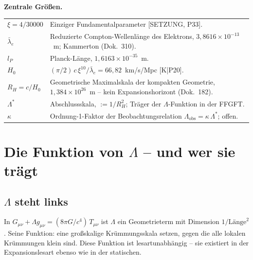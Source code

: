 \documentclass[11pt]{report}
\begin{document}
\medskip
\noindent\textbf{Zentrale Größen.}

\medskip
\begin{tabular}{@{}lp{10.5cm}}
$\xi = 4/30000$ & Einziger Fundamentalparameter [SETZUNG, P33]. \\[4pt]
$\bar\lambda_e$ & Reduzierte Compton-Wellenlänge des Elektrons,
                  $3{,}8616\times10^{-13}$~m; Kammerton (Dok.~310). \\[4pt]
$l_P$           & Planck-Länge, $1{,}6163\times10^{-35}$~m. \\[4pt]
$H_0$           & $(\pi/2)\,c\,\xi^{10}/\bar\lambda_e
                   = 66{,}82$~km/s/Mpc [K|P20]. \\[4pt]
$R_H = c/H_0$   & Geometrische Maximalskala der kompakten Geometrie,
                  $1{,}384\times10^{26}$~m -- kein Expansionshorizont
                  (Dok.~182). \\[4pt]
$\Lambda^{*}$   & Abschlussskala, $:= 1/R_H^2$; Träger der
                  $\Lambda$-Funktion in der FFGFT. \\[4pt]
$\kappa$        & Ordnung-1-Faktor der Beobachtungsrelation
                  $\Lambda_\text{obs} = \kappa\,\Lambda^{*}$; offen. \\
\end{tabular}

\chapter{Die Funktion von $\Lambda$ -- und wer sie trägt}
\label{ch:funktion}

\section{$\Lambda$ steht links}
\label{sec:links}

In $G_{\mu\nu} + \Lambda g_{\mu\nu} = (8\pi G/c^4)\,T_{\mu\nu}$ ist
$\Lambda$ ein Geometrieterm mit Dimension $1/\text{Länge}^2$. Seine
Funktion: eine großskalige Krümmungsskala setzen, gegen die alle
lokalen Krümmungen klein sind. Diese Funktion ist lesartunabhängig --
sie existiert in der Expansionslesart ebenso wie in der statischen.
\end{document}
